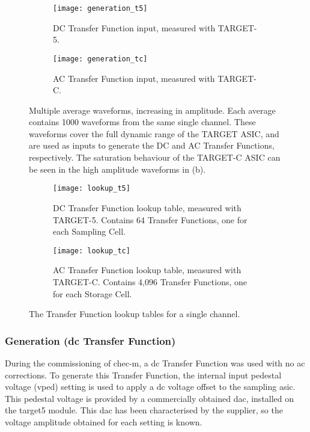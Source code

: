 \begin{figure}
  \begin{subfigure}[b]{0.49\textwidth}
    \texttt{[image: generation\_t5]}
    \caption{DC Transfer Function input, measured with TARGET-5.}
    \label{fig:generation_t5}
  \end{subfigure}
  \hfill
  \begin{subfigure}[b]{0.49\textwidth}
    \texttt{[image: generation\_tc]}
    \caption{AC Transfer Function input, measured with TARGET-C.}
    \label{fig:generation_tc}
  \end{subfigure}
  \caption[Transfer Function generation waveforms.]{Multiple average waveforms, increasing in amplitude. Each average contains 1000 waveforms from the same single channel. These waveforms cover the full dynamic range of the TARGET ASIC, and are used as inputs to generate the DC and AC Transfer Functions, respectively. The saturation behaviour of the TARGET-C ASIC can be seen in the high amplitude waveforms in (b).}
\end{figure}

\begin{figure}
  \begin{subfigure}[b]{0.49\textwidth}
    \texttt{[image: lookup\_t5]}
    \caption{DC Transfer Function lookup table, measured with TARGET-5. Contains 64 Transfer Functions, one for each Sampling Cell.}
    \label{fig:lookup_t5}
  \end{subfigure}
  \hfill
  \begin{subfigure}[b]{0.49\textwidth}
    \texttt{[image: lookup\_tc]}
    \caption{AC Transfer Function lookup table, measured with TARGET-C. Contains 4,096 Transfer Functions, one for each Storage Cell.}
    \label{fig:lookup_tc}
  \end{subfigure}
  \caption[Transfer Function lookup tables.]{The Transfer Function lookup tables for a single channel.}
\end{figure}

\subsubsection{Generation (\gls{dc} Transfer Function)}

During the commissioning of \gls{chec-m}, a \gls{dc} Transfer Function was used with no \gls{ac} corrections. To generate this Transfer Function, the internal input pedestal voltage (\gls{vped}) setting is used to apply a \gls{dc} voltage offset to the sampling \gls{asic}. This pedestal voltage is provided by a commercially obtained \gls{dac}, installed on the \gls{target5} module. This \gls{dac} has been characterised by the supplier, so the voltage amplitude obtained for each setting is known.

